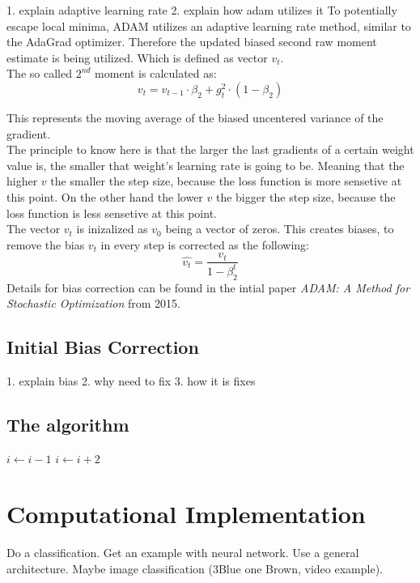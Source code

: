\documentclass[journal]{IEEEtran}
\begin{document}
1. explain adaptive learning rate
2. explain how adam utilizes it
To potentially escape local minima, ADAM utilizes an adaptive learning rate method, similar to the AdaGrad optimizer. Therefore the updated biased second raw moment estimate is being utilized. Which is defined as vector $v_t$.\\

The so called $2^{nd}$ moment is calculated as:
$$v_t = v_{t-1} \cdot \beta_2 + g_t^2 \cdot (1-\beta_2)$$

This represents the moving average of the biased uncentered variance of the gradient.\\
The principle to know here is that the larger the last gradients of a certain weight value is, the smaller that weight's learning rate is going to be. Meaning that the higher $v$ the smaller the step size, because the loss function is more sensetive at this point. On the other hand the lower $v$ the bigger the step size, because the loss function is less sensetive at this point.\\
The vector $v_t$ is inizalized as $v_0$ being a vector of zeros. This creates biases, to remove the bias $v_t$ in every step is corrected as the following:
$$\hat{v_t}=\frac{v_t}{1-\beta_2^t}$$
Details for bias correction can be found in the intial paper \textit{ADAM: A Method for Stochastic Optimization} from 2015.


\subsection{Initial Bias Correction}
1. explain bias
2. why need to fix
3. how it is fixes
\subsection{The algorithm}
\begin{algorithmic}
        \State $i \gets i-1$
    \Else
            \State $i \gets i+2$
        \EndIf
    \EndIf 
\end{algorithmic}







\section{Computational Implementation}
Do a classification.  
Get an example with neural network. Use a general architecture. Maybe image classification (3Blue one Brown, video example).
\end{document}
